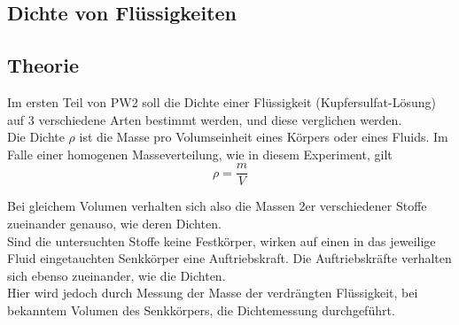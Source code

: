 \documentclass[12pt,a4paper]{article}
\begin{document}
\begin{multicols}{2}




%			
%

\section{Dichte von Flüssigkeiten}

\subsection{Theorie}

Im ersten Teil von PW2 soll die Dichte einer Flüssigkeit (Kupfersulfat-Lösung) auf 3 verschiedene Arten bestimmt werden, und diese verglichen werden.\\
Die Dichte $\rho$ ist die Masse pro Volumseinheit eines Körpers oder eines Fluids. Im Falle einer homogenen Masseverteilung, wie in diesem Experiment, gilt
$$\rho = \frac{m}{V}$$

Bei gleichem Volumen verhalten sich also die Massen 2er verschiedener Stoffe zueinander genauso, wie deren Dichten.\\
Sind die untersuchten Stoffe keine Festkörper, wirken auf einen in das jeweilige Fluid eingetauchten Senkkörper eine Auftriebskraft. Die Auftriebskräfte verhalten sich ebenso zueinander, wie die Dichten.\\
Hier wird jedoch durch Messung der Masse der verdrängten Flüssigkeit, bei bekanntem Volumen des Senkkörpers, die Dichtemessung durchgeführt.


\end{multicols}
\end{document}
